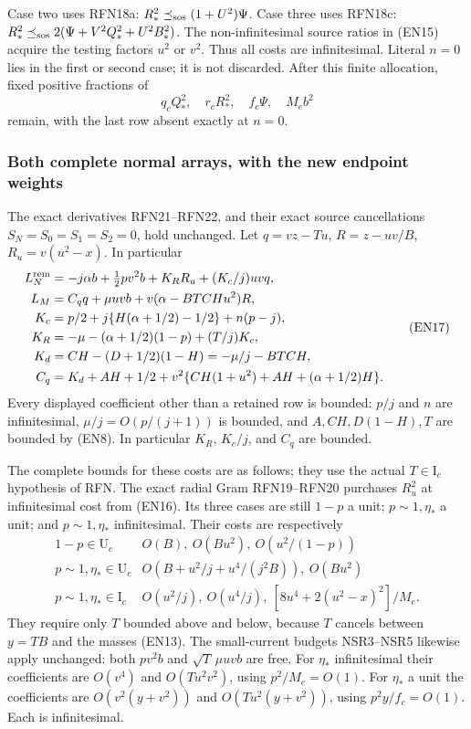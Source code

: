 Case two uses RFN18a:
$R_*^2\preceq_{\rm sos}(1+U^2)\Psi$.
Case three uses RFN18c:
$R_*^2\preceq_{\rm sos}2(\Psi+V^2Q_*^2+U^2B_*^2)$.
The non-infinitesimal source ratios in (EN15) acquire the testing
factors $u^2$ or $v^2$. Thus all costs are infinitesimal.
Literal $n=0$ lies in the first or second case; it is not discarded.
After this finite allocation, fixed positive fractions of
\[
q_cQ_*^2,\quad r_cR_*^2,\quad f_c\Psi,\quad M_eb^2       \tag{EN16}
\]
remain, with the last row absent exactly at $n=0$.

\subsubsection*{Both complete normal arrays, with the new endpoint weights}

The exact derivatives RFN21--RFN22, and their exact source cancellations
$S_N=S_0=S_1=S_2=0$, hold unchanged. Let
$q=vz-Tu$, $R=z-uv/B$, $R_u=v(u^2-x)$. In particular
\[
\begin{aligned}
L_N^{\rm rem}
&=-j\alpha b+\tfrac12pv^2b+K_RR_u+(K_c/j)uvq,\\
L_M&=C_qq+\mu uvb+v(\alpha-BTCHu^2)R,\\
K_c&=p/2+j\{H(\alpha+1/2)-1/2\}+n(p-j),\\
K_R&=-\mu-(\alpha+1/2)(1-p)+(T/j)K_c,\\
K_d&=CH-(D+1/2)(1-H)=-\mu/j-BTCH,\\
C_q&=K_d+AH+1/2+
v^2\{CH(1+u^2)+AH+(\alpha+1/2)H\}.
\end{aligned}                                                    \tag{EN17}
\]
Every displayed coefficient other than a retained row is bounded:
$p/j$ and $n$ are infinitesimal, $\mu/j=O(p/(j+1))$ is bounded,
and $A,CH,D(1-H),T$ are bounded by (EN8).
In particular $K_R$, $K_c/j$, and $C_q$ are bounded.

The complete bounds for these costs are as follows; they use the actual
$T\in\mathrm I_c$ hypothesis of RFN.
The exact radial Gram RFN19--RFN20 purchases $R_u^2$ at infinitesimal
cost from (EN16). Its three cases are still $1-p$ a unit;
$p\sim1,\eta_*$ a unit; and $p\sim1,\eta_*$ infinitesimal.
Their costs are respectively
\[
\begin{array}{c|l}
1-p\in\mathrm U_c&O(B),\ O(Bu^2),\ O(u^2/(1-p))\\
p\sim1,\eta_*\in\mathrm U_c&
 O(B+u^2/j+u^4/(j^2B)),\ O(Bu^2)\\
p\sim1,\eta_*\in\mathrm I_c&
 O(u^2/j),\ O(u^4/j),\
 [8u^4+2(u^2-x)^2]/M_e .
\end{array}                                                    \tag{EN18}
\]
They require only $T$ bounded above and below, because $T$ cancels
between $y=TB$ and the masses (EN13).
The small-current budgets NSR3--NSR5 likewise apply unchanged:
both $pv^2b$ and $\sqrt T\,\mu uvb$ are free.
For $\eta_*$ infinitesimal their coefficients are
$O(v^4)$ and $O(Tu^2v^2)$, using $p^2/M_e=O(1)$.
For $\eta_*$ a unit the coefficients are
$O(v^2(y+v^2))$ and $O(Tu^2(y+v^2))$, using
$p^2y/f_c=O(1)$. Each is infinitesimal.

